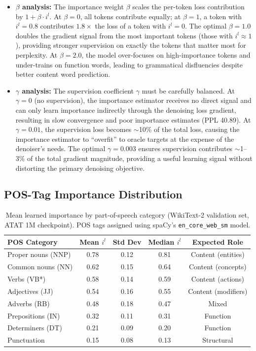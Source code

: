 \begin{itemize}[leftmargin=*,itemsep=2pt]
    \item \textbf{$\beta$ analysis:} The importance weight $\beta$ scales the per-token loss contribution by $1 + \beta \cdot i^l$. At $\beta = 0$, all tokens contribute equally; at $\beta = 1$, a token with $i^l = 0.8$ contributes $1.8\times$ the loss of a token with $i^l = 0$. The optimal $\beta = 1.0$ doubles the gradient signal from the most important tokens (those with $i^l \approx 1$), providing stronger supervision on exactly the tokens that matter most for perplexity. At $\beta = 2.0$, the model over-focuses on high-importance tokens and under-trains on function words, leading to grammatical disfluencies despite better content word prediction.
    
    \item \textbf{$\gamma$ analysis:} The supervision coefficient $\gamma$ must be carefully balanced. At $\gamma = 0$ (no supervision), the importance estimator receives no direct signal and can only learn importance indirectly through the denoising loss gradient, resulting in slow convergence and poor importance estimates (PPL 40.89). At $\gamma = 0.01$, the supervision loss becomes ${\sim}$10\% of the total loss, causing the importance estimator to ``overfit'' to oracle targets at the expense of the denoiser's needs. The optimal $\gamma = 0.003$ ensures supervision contributes ${\sim}$1--3\% of the total gradient magnitude, providing a useful learning signal without distorting the primary denoising objective.
\end{itemize}

\subsection{POS-Tag Importance Distribution}

\begin{table}[h]
\centering
\caption{Mean learned importance by part-of-speech category (WikiText-2 validation set, ATAT 1M checkpoint). POS tags assigned using spaCy's \texttt{en\_core\_web\_sm} model.}
\label{tab:pos-full}
\begin{tabular}{lcccc}
\toprule
\textbf{POS Category} & \textbf{Mean $i^l$} & \textbf{Std Dev} & \textbf{Median $i^l$} & \textbf{Expected Role} \\
\midrule
Proper nouns (NNP) & 0.78 & 0.12 & 0.81 & Content (entities) \\
Common nouns (NN) & 0.62 & 0.15 & 0.64 & Content (concepts) \\
Verbs (VB*) & 0.58 & 0.14 & 0.59 & Content (actions) \\
Adjectives (JJ) & 0.54 & 0.16 & 0.55 & Content (modifiers) \\
Adverbs (RB) & 0.48 & 0.18 & 0.47 & Mixed \\
Prepositions (IN) & 0.32 & 0.11 & 0.31 & Function \\
Determiners (DT) & 0.21 & 0.09 & 0.20 & Function \\
Punctuation & 0.15 & 0.08 & 0.13 & Structural \\
\bottomrule
\end{tabular}
\end{table}

